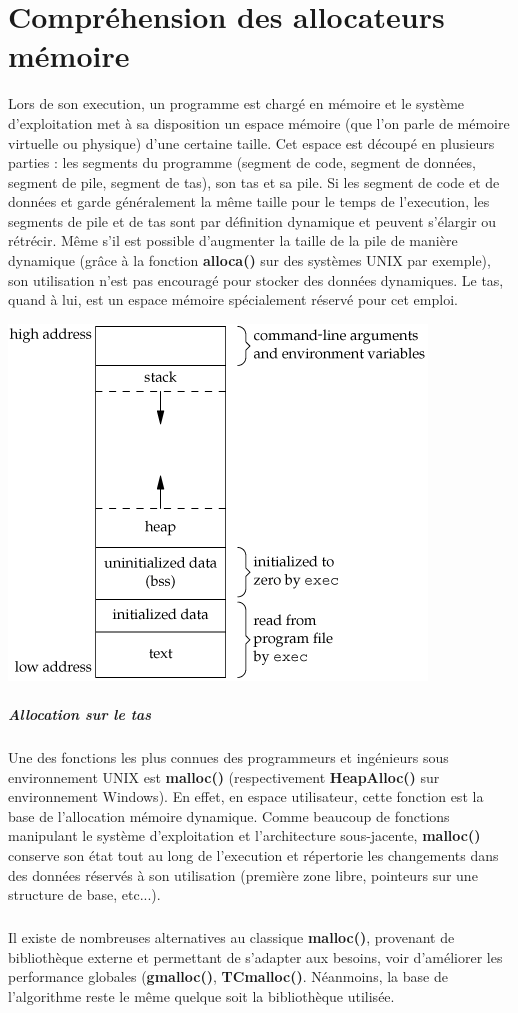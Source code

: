 \section{Compréhension des allocateurs mémoire}
Lors de son execution, un programme est chargé en mémoire et le système d'exploitation
met à sa disposition un espace mémoire (que l'on parle de mémoire virtuelle ou physique)
d'une certaine taille. Cet espace est découpé en plusieurs parties : les segments du programme
(segment de code, segment de données, segment de pile, segment de tas), son tas et sa pile. Si les segment de code et de
données et garde généralement la même taille pour le temps de l'execution, les segments de pile et de tas sont par définition
dynamique et peuvent s'élargir ou rétrécir. Même s'il est possible d'augmenter la taille de la pile de manière dynamique (grâce
à la fonction \textbf{alloca()} sur des systèmes UNIX par exemple), son utilisation n'est pas encouragé pour stocker des données
dynamiques. Le tas, quand à lui, est un espace mémoire spécialement réservé pour cet emploi.
\begin{center}
\includegraphics[scale=0.4]{memory-layout.png}\newline
\end{center}


\subparagraph{Allocation sur le tas}
Une des fonctions les plus connues des programmeurs et ingénieurs sous environnement UNIX est \textbf{malloc()} (respectivement \textbf{HeapAlloc()} sur
environnement Windows). En effet, en espace utilisateur, cette fonction est la base de l'allocation mémoire dynamique. Comme beaucoup de fonctions
manipulant le système d'exploitation et l'architecture sous-jacente, \textbf{malloc()} conserve son état tout au long de l'execution et répertorie les
changements dans des données réservés à son utilisation (première zone libre, pointeurs sur une structure de base, etc...).
\subparagraph{}
Il existe de nombreuses alternatives au classique \textbf{malloc()}, provenant de bibliothèque externe et permettant de s'adapter aux besoins, voir d'améliorer les
performance globales (\textbf{gmalloc()}, \textbf{TCmalloc()}. Néanmoins, la base de l'algorithme reste le même quelque soit la bibliothèque utilisée.

